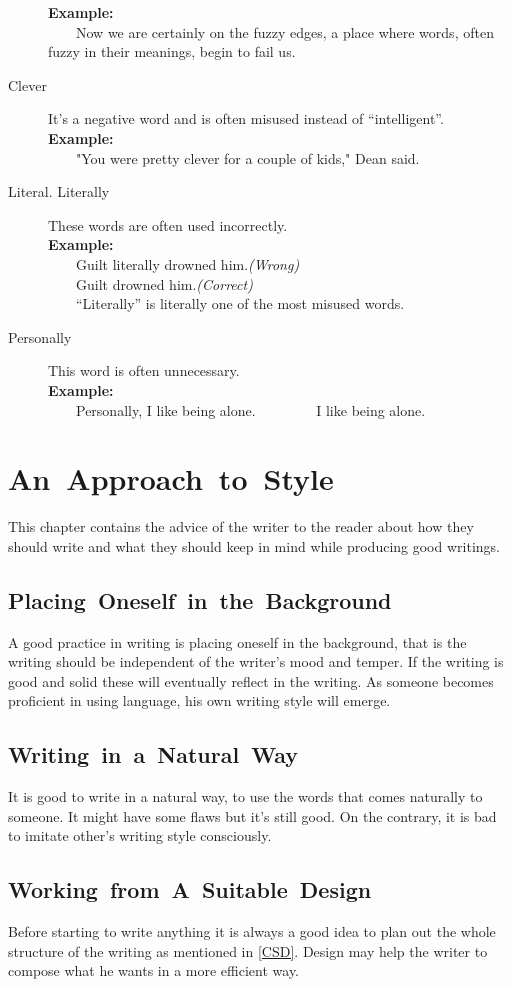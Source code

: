 \documentclass[12pt]{report}
\newcommand{\xmpl}{\textbf{Example:}\\} %
\newcommand{\indnt}{\ \ \ \ } %
\begin{document}
\begin{description}
	\xmpl
	\indnt Now we are certainly on the fuzzy edges, a place where words, often fuzzy in their meanings, begin to fail us.
	\item[Clever] It's a negative word and is often misused instead of ``intelligent''.\\
	\xmpl
	\indnt "You were pretty clever for a couple of kids," Dean said.
	\item[Literal. Literally] These words are often used incorrectly.\\
	\xmpl
	\indnt Guilt literally drowned him.\textit{(Wrong)}\\
	\indnt Guilt drowned him.\textit{(Correct)}\\
	\indnt ``Literally'' is literally one of the most misused words.
	\item[Personally] This word is often unnecessary.\\
	\xmpl
	\indnt Personally, I like being alone. \indnt \indnt I like being alone.
\end{description}


\chapter{\mbox{An Approach to Style}}
This chapter contains the advice of the writer to the reader about how they should write and what they should keep in mind while producing good writings.


\section{\mbox{Placing Oneself in the Background}}
A good practice in writing is placing oneself in the background, that is the writing should be independent of the writer's mood and temper. If the writing is good and solid these will eventually reflect in the writing. As someone becomes proficient in using language, his own writing style will emerge.


\section{\mbox{Writing in a Natural Way}}
It is good to write in a natural way, to use the words that comes naturally to someone. It might have some flaws but it's still good. On the contrary, it is bad to imitate other's writing style consciously.


\section{\mbox{Working from A Suitable Design}}
Before starting to write anything it is always a good idea to plan out the whole structure of the writing as mentioned in \ref{CSD}. Design may help the writer to compose what he wants in a more efficient way.
\end{document}

